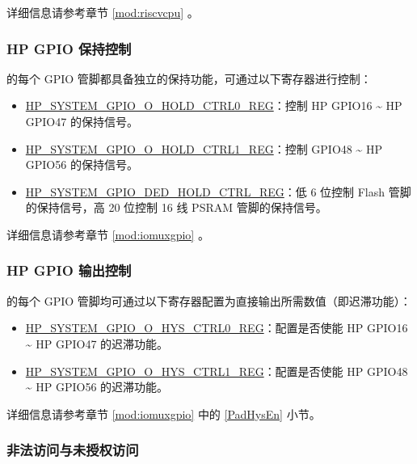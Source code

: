 \documentclass[main\_\_CN.tex]{subfiles}
\begin{document}
详细信息请参考章节 \ref{mod:riscvcpu} \textit{}。

\subsubsection{HP GPIO 保持控制}

\chipname{} 的每个 GPIO 管脚都具备独立的保持功能，可通过以下寄存器进行控制：

\begin{itemize}
    \item \hyperref[regdesc:HPSYSTEMGPIOOHOLDCTRL0REG]{HP\_SYSTEM\_GPIO\_O\_HOLD\_CTRL0\_REG}：控制 HP GPIO16 \textasciitilde{} HP GPIO47 的保持信号。
    \item \hyperref[regdesc:HPSYSTEMGPIOOHOLDCTRL1REG]{HP\_SYSTEM\_GPIO\_O\_HOLD\_CTRL1\_REG}：控制 GPIO48 \textasciitilde{} HP GPIO56 的保持信号。
    \item \hyperref[regdesc:HPSYSTEMGPIODEDHOLDCTRLREG]{HP\_SYSTEM\_GPIO\_DED\_HOLD\_CTRL\_REG}：低 6 位控制 Flash 管脚的保持信号，高 20 位控制 16 线 PSRAM 管脚的保持信号。
\end{itemize}

详细信息请参考章节 \ref{mod:iomuxgpio} \textit{}。

\subsubsection{HP GPIO 输出控制}

\chipname{} 的每个 GPIO 管脚均可通过以下寄存器配置为直接输出所需数值（即迟滞功能）：

\begin{itemize}
    \item \hyperref[regdesc:HPSYSTEMGPIOOHYSCTRL0REG]{HP\_SYSTEM\_GPIO\_O\_HYS\_CTRL0\_REG}：配置是否使能 HP GPIO16 \textasciitilde{} HP GPIO47 的迟滞功能。
    \item \hyperref[regdesc:HPSYSTEMGPIOOHYSCTRL1REG]{HP\_SYSTEM\_GPIO\_O\_HYS\_CTRL1\_REG}：配置是否使能 HP GPIO48 \textasciitilde{} HP GPIO56 的迟滞功能。
\end{itemize}

详细信息请参考章节 \ref{mod:iomuxgpio} \textit{} 中的 \ref{PadHysEn} 小节。

\subsubsection{非法访问与未授权访问}
\end{document}
